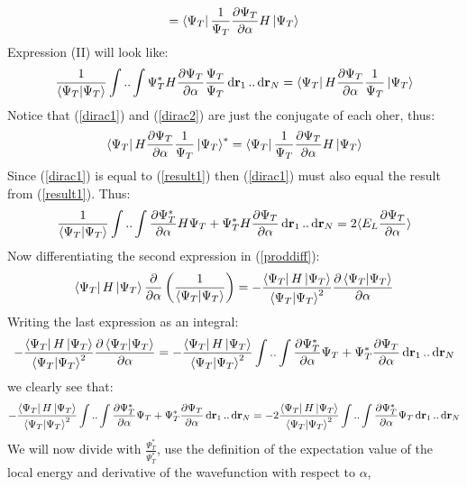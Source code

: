 \documentclass[a4paper, 10pt]{article}
\begin{document}
\begin{appendices}
\begin{align}
= \bra{\Psi_{T}}\frac{1}{\Psi_{T}}\pdv{\Psi_{T}}{\alpha}H\ket{\Psi_{T}}
\label{dirac1}
\end{align}
Expression (II) will look like:
\begin{align}
\frac{1}{\braket{\Psi_{T}}}\int..\int\Psi_{T}^{*}H\pdv{\Psi_{T}}{\alpha}\frac{\Psi_{T}}{\Psi_{T}}\dd{\bold{r}_{1}}..\dd{\bold{r}_{N}}
= \bra{\Psi_{T}}H\pdv{\Psi_{T}}{\alpha}\frac{1}{\Psi_{T}}\ket{\Psi_{T}}
\label{dirac2}
\end{align}
Notice that (\ref{dirac1}) and (\ref{dirac2}) are just the conjugate of each oher, thus:
\begin{align}
\bra{\Psi_{T}}H\pdv{\Psi_{T}}{\alpha}\frac{1}{\Psi_{T}}\ket{\Psi_{T}}^{*}
=
\bra{\Psi_{T}}\frac{1}{\Psi_{T}}\pdv{\Psi_{T}}{\alpha}H\ket{\Psi_{T}}
\end{align}
Since (\ref{dirac1}) is equal to (\ref{result1}) then (\ref{dirac1}) must also equal the result from
(\ref{result1}). Thus:
\begin{align}
\frac{1}{\braket{\Psi_{T}}}\int..\int\pdv{\Psi_{T}^{*}}{\alpha}H\Psi_{T}
+   \Psi_{T}^{*}H\pdv{\Psi_{T}}{\alpha}\dd{\bold{r}_{1}}..\dd{\bold{r}_{N}}
= 2 \langle E_{L}\pdv{\Psi_{T}}{\alpha} \rangle
\end{align}
Now differentiating the second expression in (\ref{proddiff}):
\begin{align}
\bra{\Psi_{T}}H\ket{\Psi_{T}}\pdv{\alpha}\left(\frac{1}{\braket{\Psi_{T}}}\right)
= -\frac{\bra{\Psi_{T}}H\ket{\Psi_{T}}}{\braket{\Psi_{T}}^{2}}\pdv{\braket{\Psi_{T}}}{\alpha}
\end{align}
Writing the last expression as an integral:
\begin{align}
-\frac{\bra{\Psi_{T}}H\ket{\Psi_{T}}}{\braket{\Psi_{T}}^{2}}\pdv{\braket{\Psi_{T}}}{\alpha}
= -\frac{\bra{\Psi_{T}}H\ket{\Psi_{T}}}{\braket{\Psi_{T}}^{2}}\int..\int \pdv{\Psi_{T}^{*}}{\alpha}\Psi_{T} +
\Psi_{T}^{*}\pdv{\Psi_{T}}{\alpha}\dd{\bold{r}_{1}}..\dd{\bold{r}_{N}}
\end{align}
we clearly see that:
\begin{align}
-\frac{\bra{\Psi_{T}}H\ket{\Psi_{T}}}{\braket{\Psi_{T}}^{2}}\int..\int \pdv{\Psi_{T}^{*}}{\alpha}\Psi_{T}
+
\Psi_{T}^{*}\pdv{\Psi_{T}}{\alpha}\dd{\bold{r}_{1}}..\dd{\bold{r}_{N}}
=
-2\frac{\bra{\Psi_{T}}H\ket{\Psi_{T}}}{\braket{\Psi_{T}}^{2}}\int..\int \pdv{\Psi_{T}^{*}}{\alpha}\Psi_{T}\dd{\bold{r}_{1}}..\dd{\bold{r}_{N}}
\end{align}
We will now divide with $\frac{\Psi_{T}^{*}}{\Psi_{T}^{*}}$,
use the definition of the expectation value of the local energy and derivative of the wavefunction with respect to $\alpha$,

\end{appendices}
\end{document}
